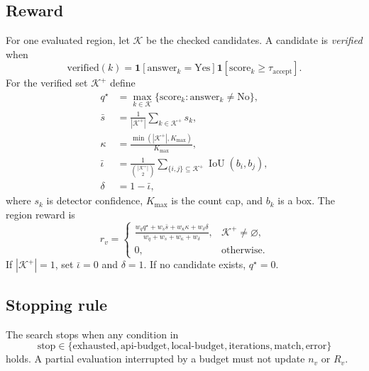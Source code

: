 \documentclass[11pt]{article}
\newcommand{\indicator}[1]{\mathbf{1}\!\left[#1\right]}
\newcommand{\set}[1]{\mathcal{#1}}
\begin{document}
\subsection{Reward}

For one evaluated region, let $\set{K}$ be the checked candidates. A candidate
is \emph{verified} when
\begin{equation}
  \text{verified}(k)
  = \indicator{\text{answer}_k = \text{Yes}}
    \indicator{\text{score}_k \ge \tau_{\mathrm{accept}}}.
\end{equation}
For the verified set $\set{K}^{+}$ define
\begin{align}
  q^\star &= \max_{k \in \set{K}} \{\text{score}_k : \text{answer}_k \ne \text{No}\}, \\
  \bar{s} &= \frac{1}{|\set{K}^{+}|}
             \sum_{k \in \set{K}^{+}} s_k, \\
  \kappa &= \frac{\min(|\set{K}^{+}|, K_{\max})}{K_{\max}}, \\
  \bar{\iota} &= \frac{1}{\binom{|\set{K}^{+}|}{2}}
             \sum_{\{i,j\} \subseteq \set{K}^{+}}
             \operatorname{IoU}(b_i,b_j), \\
  \delta &= 1 - \bar{\iota},
\end{align}
where $s_k$ is detector confidence, $K_{\max}$ is the count cap, and $b_k$ is a box.
The region reward is
\begin{equation}
  r_v =
  \begin{cases}
    \displaystyle
    \frac{
      w_q q^\star + w_s \bar{s} + w_\kappa \kappa + w_\delta \delta
    }{
      w_q + w_s + w_\kappa + w_\delta
    }, & \set{K}^{+} \ne \varnothing, \\[8pt]
    0, & \text{otherwise}.
  \end{cases}
  \label{eq:reward}
\end{equation}
If $|\set{K}^{+}| = 1$, set $\bar{\iota} = 0$ and $\delta = 1$. If no candidate exists, $q^\star = 0$.

\subsection{Stopping rule}

The search stops when any condition in
\begin{equation}
  \text{stop} \in
  \{\text{exhausted}, \text{api-budget}, \text{local-budget},
    \text{iterations}, \text{match}, \text{error}\}
\end{equation}
holds. A partial evaluation interrupted by a budget must not update $n_v$ or
$R_v$.
\end{document}
